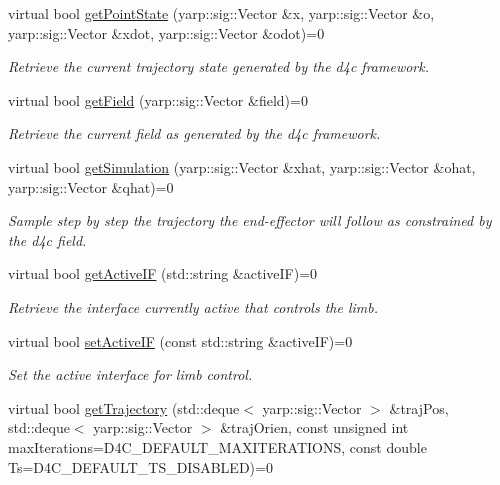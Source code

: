 \begin{DoxyCompactItemize}
virtual bool \hyperlink{classiCub_1_1d4c_1_1D4C_a8e9e4d5fad4ad121864c93bacc392161}{get\+Point\+State} (yarp\+::sig\+::\+Vector \&x, yarp\+::sig\+::\+Vector \&o, yarp\+::sig\+::\+Vector \&xdot, yarp\+::sig\+::\+Vector \&odot)=0
\begin{DoxyCompactList}\small\item\em Retrieve the current trajectory state generated by the d4c framework. \end{DoxyCompactList}\item 
virtual bool \hyperlink{classiCub_1_1d4c_1_1D4C_aa82fff9783d8210c97bfcdbfa5d01813}{get\+Field} (yarp\+::sig\+::\+Vector \&field)=0
\begin{DoxyCompactList}\small\item\em Retrieve the current field as generated by the d4c framework. \end{DoxyCompactList}\item 
virtual bool \hyperlink{classiCub_1_1d4c_1_1D4C_ac3d362bba8082a83a3cfba1942c1370e}{get\+Simulation} (yarp\+::sig\+::\+Vector \&xhat, yarp\+::sig\+::\+Vector \&ohat, yarp\+::sig\+::\+Vector \&qhat)=0
\begin{DoxyCompactList}\small\item\em Sample step by step the trajectory the end-\/effector will follow as constrained by the d4c field. \end{DoxyCompactList}\item 
virtual bool \hyperlink{classiCub_1_1d4c_1_1D4C_a601278b27f13393fbc50dd548f08fdda}{get\+Active\+I\+F} (std\+::string \&active\+I\+F)=0
\begin{DoxyCompactList}\small\item\em Retrieve the interface currently active that controls the limb. \end{DoxyCompactList}\item 
virtual bool \hyperlink{classiCub_1_1d4c_1_1D4C_a219e88e157347cb291d55bf5067e4ceb}{set\+Active\+I\+F} (const std\+::string \&active\+I\+F)=0
\begin{DoxyCompactList}\small\item\em Set the active interface for limb control. \end{DoxyCompactList}\item 
virtual bool \hyperlink{classiCub_1_1d4c_1_1D4C_aec027b12db795a04fc670c0cd44f3e80}{get\+Trajectory} (std\+::deque$<$ yarp\+::sig\+::\+Vector $>$ \&traj\+Pos, std\+::deque$<$ yarp\+::sig\+::\+Vector $>$ \&traj\+Orien, const unsigned int max\+Iterations=D4\+C\+\_\+\+D\+E\+F\+A\+U\+L\+T\+\_\+\+M\+A\+X\+I\+T\+E\+R\+A\+T\+I\+O\+N\+S, const double Ts=D4\+C\+\_\+\+D\+E\+F\+A\+U\+L\+T\+\_\+\+T\+S\+\_\+\+D\+I\+S\+A\+B\+L\+E\+D)=0

\end{DoxyCompactItemize}
